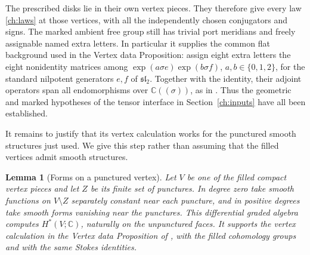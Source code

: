 \documentclass[11pt]{article}
\newtheorem{lemma}[theorem]{Lemma}
\theoremstyle{definition}
\theoremstyle{remark}
\begin{document}
The prescribed disks lie in their own vertex pieces.  They therefore
give every law \eqref{ch:laws} at those vertices, with all the
independently chosen conjugators and signs.  The marked ambient free
group still has trivial port meridians and freely assignable named
extra letters.  In particular it supplies the common flat background
used in the Vertex data Proposition: assign eight extra letters the
eight nonidentity matrices among
$\exp(a\sigma e)\exp(b\sigma f)$, $a,b\in\{0,1,2\}$, for the
standard nilpotent generators $e,f$ of $\mathfrak{sl}_2$.
Together with the identity, their adjoint operators span all
endomorphisms over $\mathbb C((\sigma))$, as in
\cite[Proposition~6.1]{TO}.
Thus the geometric and marked hypotheses of the tensor interface
in Section~\ref{ch:inputs} have all been established.

It remains to justify that its vertex calculation works for the
punctured smooth structures just used.  We give this step rather
than assuming that the filled vertices admit smooth structures.

\begin{lemma}[Forms on a punctured vertex]
\label{ch:puncture-forms}
Let $V$ be one of the filled compact vertex pieces and let $Z$ be
its finite set of punctures.  In degree zero take smooth functions
on $V\setminus Z$ separately constant near each puncture, and in
positive degrees take smooth forms vanishing near the punctures.
This differential graded algebra computes $H^*(V;\mathbb C)$,
naturally on the unpunctured faces.  It supports the vertex
calculation in the Vertex data Proposition of \cite{TO}, with the
filled cohomology groups and with the same Stokes identities.
\end{lemma}
\end{document}

